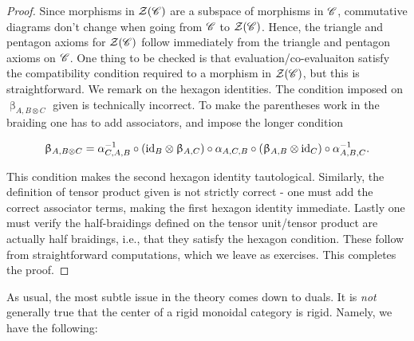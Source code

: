 \documentclass{article}
\theoremstyle{definition}
\numberwithin{figure}{section}
\begin{document}
\begin{proof} Since morphisms in $\mathcal{Z}(\mathscr{C})$ are a subspace of morphisms in $\mathscr{C}$, commutative diagrams don't change when going from $\mathscr{C}$ to $\mathcal{Z}(\mathscr{C})$. Hence, the triangle and pentagon axioms for $\mathcal{Z}(\mathscr{C})$ follow immediately from the triangle and pentagon axioms on $\mathscr{C}$. One thing to be checked is that evaluation/co-evaluaiton satisfy the compatibility condition required to a morphism in $\mathcal{Z}(\mathscr{C})$, but this is straightforward. We remark on the hexagon identities. The condition imposed on $\upbeta_{A,B\otimes C}$ given is technically incorrect. To make the parentheses work in the braiding one has to add associators, and impose the longer condition

$$\upbeta_{A,B\otimes C}=\alpha_{C,A,B}^{-1}\circ \left(\mathrm{id}_{B}\otimes \upbeta_{A,C}\right)\circ \alpha_{A,C,B}\circ\left(\upbeta_{A,B}\otimes \mathrm{id}_C\right)\circ \alpha^{-1}_{A,B,C}.$$

This condition makes the second hexagon identity tautological. Similarly, the definition of tensor product given is not strictly correct - one must add the correct associator terms, making the first hexagon identity immediate. Lastly one must verify the half-braidings defined on the tensor unit/tensor product are actually half braidings, i.e., that they satisfy the hexagon condition. These follow from straightforward computations, which we leave as exercises. This completes the proof.

\end{proof}

As usual, the most subtle issue in the theory comes down to duals. It is \textit{not} generally true that the center of a rigid monoidal category is rigid. Namely, we have the following:
\end{document}
